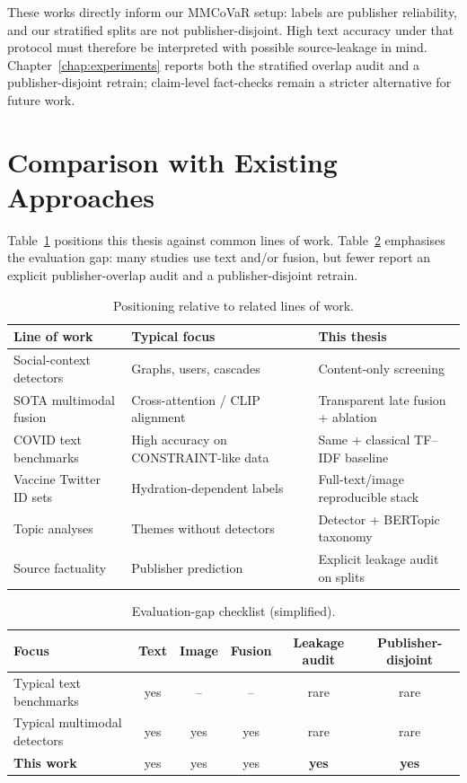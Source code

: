 \documentclass[12pt, a4paper]{report}
\begin{document}
These works directly inform our MMCoVaR setup: labels are publisher reliability, and our stratified splits are not publisher-disjoint.
High text accuracy under that protocol must therefore be interpreted with possible source-leakage in mind.
Chapter~\ref{chap:experiments} reports both the stratified overlap audit and a publisher-disjoint retrain; claim-level fact-checks remain a stricter alternative for future work.

\section{Comparison with Existing Approaches}
\label{sec:comparison}

Table~\ref{tab:related-compare} positions this thesis against common lines of work.
Table~\ref{tab:gap-checklist} emphasises the evaluation gap: many studies use text and/or fusion, but fewer report an explicit publisher-overlap audit and a publisher-disjoint retrain.

\begin{table}[htbp]
\centering
\caption{Positioning relative to related lines of work.}
\label{tab:related-compare}
\small
\begin{tabular}{p{3.2cm}p{5.2cm}p{4.2cm}}
\hline
Line of work & Typical focus & This thesis \\
\hline
Social-context detectors & Graphs, users, cascades~\cite{shu2017fake} & Content-only screening \\
SOTA multimodal fusion & Cross-attention / CLIP alignment~\cite{wu2021mcan,zhou2023fndclip} & Transparent late fusion + ablation \\
COVID text benchmarks & High accuracy on CONSTRAINT-like data~\cite{patwa2021fighting} & Same + classical TF--IDF baseline \\
Vaccine Twitter ID sets & Hydration-dependent labels~\cite{hayawi2022antivax,muric2021covid} & Full-text/image reproducible stack \\
Topic analyses & Themes without detectors~\cite{grootendorst2022bertopic} & Detector + BERTopic taxonomy \\
Source factuality & Publisher prediction~\cite{baly2018predicting} & Explicit leakage audit on splits \\
\hline
\end{tabular}
\end{table}

\begin{table}[htbp]
\centering
\caption{Evaluation-gap checklist (simplified).}
\label{tab:gap-checklist}
\small
\begin{tabular}{lccccc}
\hline
Focus & Text & Image & Fusion & Leakage audit & Publisher-disjoint \\
\hline
Typical text benchmarks & yes & -- & -- & rare & rare \\
Typical multimodal detectors & yes & yes & yes & rare & rare \\
\textbf{This work} & yes & yes & yes & \textbf{yes} & \textbf{yes} \\
\hline
\end{tabular}
\end{table}
\end{document}

